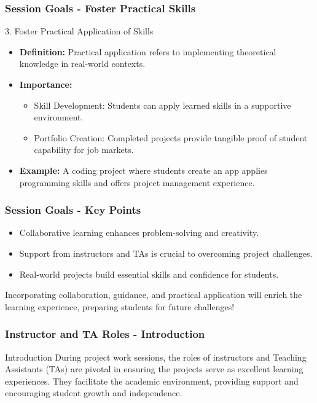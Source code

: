 \documentclass[aspectratio=169]{beamer}
\begin{document}
\begin{frame}[fragile]
    \frametitle{Session Goals - Foster Practical Skills}
    \begin{block}{3. Foster Practical Application of Skills}
        \begin{itemize}
            \item \textbf{Definition:} Practical application refers to implementing theoretical knowledge in real-world contexts.
            \item \textbf{Importance:}
            \begin{itemize}
                \item Skill Development: Students can apply learned skills in a supportive environment.
                \item Portfolio Creation: Completed projects provide tangible proof of student capability for job markets.
            \end{itemize}
            \item \textbf{Example:} A coding project where students create an app applies programming skills and offers project management experience.
        \end{itemize}
    \end{block}
\end{frame}

\begin{frame}[fragile]
    \frametitle{Session Goals - Key Points}
    \begin{itemize}
        \item Collaborative learning enhances problem-solving and creativity.
        \item Support from instructors and TAs is crucial to overcoming project challenges.
        \item Real-world projects build essential skills and confidence for students.
    \end{itemize}

    Incorporating collaboration, guidance, and practical application will enrich the learning experience, preparing students for future challenges!
\end{frame}

\begin{frame}[fragile]
    \frametitle{Instructor and TA Roles - Introduction}
    \begin{block}{Introduction}
        During project work sessions, the roles of instructors and Teaching Assistants (TAs) are pivotal in ensuring the projects serve as excellent learning experiences. They facilitate the academic environment, providing support and encouraging student growth and independence.
    \end{block}
\end{frame}
\end{document}
